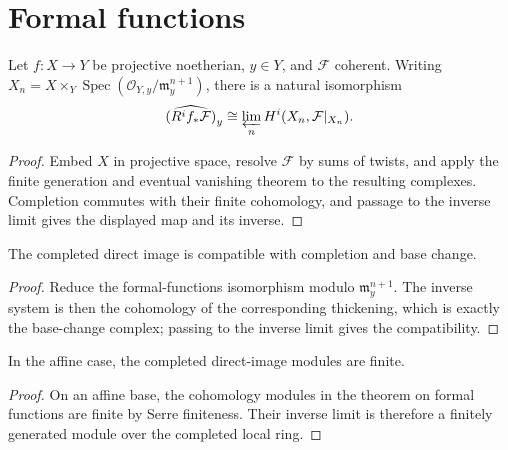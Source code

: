 \section{Formal functions}
\label{ha-ch3-sec11}
\begin{theorem}\label{ha-ch3-thm-formal-functions}
Let $f:X\to Y$ be projective noetherian, $y\in Y$, and $\mathcal F$ coherent.
Writing $X_n=X\times_Y\operatorname{Spec}(\mathcal O_{Y,y}/\mathfrak m_y^{n+1})$,
there is a natural isomorphism
\[\widehat{(R^if_*\mathcal F)}_y\cong\varprojlim_nH^i(X_n,\mathcal F|_{X_n}).\]

\end{theorem}
\begin{proof}
Embed $X$ in projective space, resolve $\mathcal F$ by sums of
twists, and apply the finite generation and eventual vanishing theorem to the
resulting complexes.  Completion commutes with their finite cohomology, and
passage to the inverse limit gives the displayed map and its inverse.
\end{proof}
\begin{corollary}\label{ha-ch3-cor-formal-functions}
The completed direct image is compatible with completion and base change.

\end{corollary}
\begin{proof}

Reduce the formal-functions isomorphism modulo $\mathfrak m_y^{n+1}$.  The inverse system is then the
 cohomology of the corresponding thickening, which is exactly the base-change complex; passing to the
 inverse limit gives the compatibility.

\end{proof}
\begin{corollary}\label{ha-ch3-cor-formal-affine}
In the affine case, the completed direct-image modules are finite.

\end{corollary}
\begin{proof}

On an affine base, the cohomology modules in the theorem on formal functions are finite by
Serre finiteness.  Their inverse limit is therefore a finitely generated module over the completed
local ring.

\end{proof}
